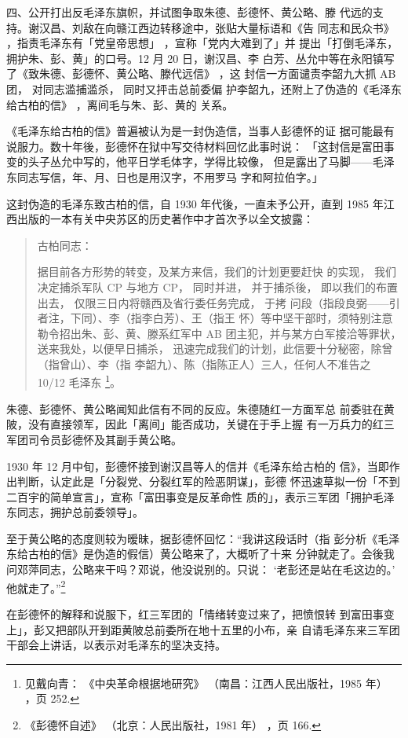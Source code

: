 四、公开打出反毛泽东旗帜，并试图争取朱德、彭德怀、黄公略、滕
代远的支持。谢汉昌、刘敌在向赣江西边转移途中，张贴大量标语和《告
同志和民众书》
，指责毛泽东有「党皇帝思想」
，宣称「党内大难到了」并
提出「打倒毛泽东，拥护朱、彭、黄」的口号。12 月 20 日，谢汉昌、李
白芳、丛允中等在永阳镇写了《致朱德、彭德怀、黄公略、滕代远信》
，这
封信一方面谴责李韶九大抓 AB 团，
对同志滥捕滥杀，
同时又抨击总前委偏
护李韶九，还附上了伪造的《毛泽东给古柏的信》
，离间毛与朱、彭、黄的
关系。

《毛泽东给古柏的信》普遍被认为是一封伪造信，当事人彭德怀的证
据可能最有说服力。数十年後，彭德怀在狱中写交待材料回忆此事时说：
「这封信是富田事变的头子丛允中写的，他平日学毛体字，学得比较像，
但是露出了马脚——毛泽东同志写信，年、月、日也是用汉字，不用罗马
字和阿拉伯字。」

这封伪造的毛泽东致古柏的信，自 1930 年代後，一直未予公开，直到
1985 年江西出版的一本有关中央苏区的历史著作中才首次予以全文披露：
\begin{quote}
\noindent
	\fzwkai 古柏同志：
	
据目前各方形势的转变，及某方来信，我们的计划更要赶快
的实现，
我们决定捕杀军队 CP 与地方 CP，
同时并进，
并于捕杀後，
即以我们的布置出去，
仅限三日内将赣西及省行委任务完成，
于拷
问段（指段良弼——引者注，下同）、李（指李白芳）、王（指王
怀）等中坚干部时，须特别注意勒令招出朱、彭、黄、滕系红军中
AB 团主犯，并与某方白军接洽等罪状，送来我处，以便早日捕杀，
迅速完成我们的计划，此信要十分秘密，除曾（指曾山）、李（指
李韶九）、陈（指陈正人）三人，任何人不准告之 10/12 毛泽东
\footnote{ 见戴向青：
《中央革命根据地研究》
（南昌：江西人民出版社，1985 年）
，页 252.}。
\end{quote}

朱德、彭德怀、黄公略闻知此信有不同的反应。朱德随红一方面军总
前委驻在黄陂，没有直接领军，因此「离间」能否成功，关键在于手上握
有一万兵力的红三军团司令员彭德怀及其副手黄公略。

1930 年 12 月中旬，彭德怀接到谢汉昌等人的信并《毛泽东给古柏的
信》，当即作出判断，认定此是「分裂党、分裂红军的险恶阴谋」，彭德
怀迅速草拟一份「不到二百宇的简单宣言」，宣称「富田事变是反革命性
质的」，表示三军团「拥护毛泽东同志，拥护总前委领导」。

至于黄公略的态度则较为暧昧，据彭德怀回忆：“我讲这段话时（指 彭分析《毛泽
东给古柏的信》是伪造的假信）黄公略来了，大概听了十来 分钟就走了。会後我
问邓萍同志，公略来干吗？邓说，他没说别的。只说： ‘老彭还是站在毛这边的。’
他就走了。”\footnote{ 《彭德怀自述》 （北京：人民出版社，1981 年） ，页
166.}

在彭德怀的解释和说服下，红三军团的「情绪转变过来了，把愤恨转
到富田事变上」，彭又把部队开到距黄陂总前委所在地十五里的小布，亲
自请毛泽东来三军团干部会上讲话，以表示对毛泽东的坚决支持。


